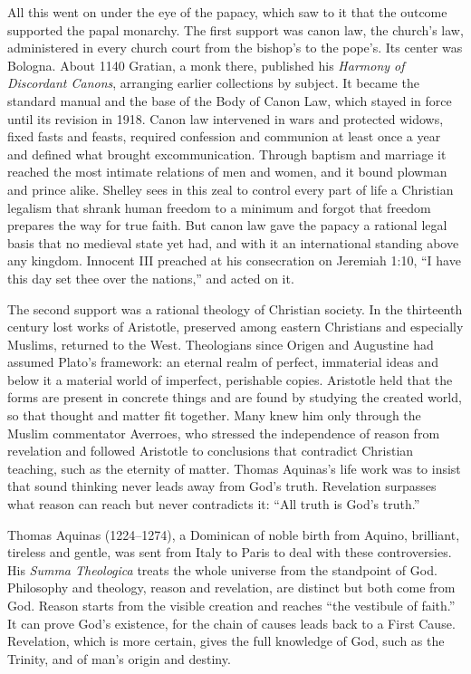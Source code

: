 All this went on under the eye of the papacy, which saw to it that the outcome supported the papal
monarchy. The first support was canon law, the church's law, administered in every church court from
the bishop's to the pope's. Its center was Bologna. About 1140 Gratian, a monk there, published his
\emph{Harmony of Discordant Canons}, arranging earlier collections by subject. It became the
standard manual and the base of the Body of Canon Law, which stayed in force until its revision in
1918. Canon law intervened in wars and protected widows, fixed fasts and feasts, required confession
and communion at least once a year and defined what brought excommunication. Through baptism and
marriage it reached the most intimate relations of men and women, and it bound plowman and prince
alike. Shelley sees in this zeal to control every part of life a Christian legalism that shrank human
freedom to a minimum and forgot that freedom prepares the way for true faith. But canon law gave the
papacy a rational legal basis that no medieval state yet had, and with it an international standing
above any kingdom. Innocent III preached at his consecration on Jeremiah 1:10, ``I have this day set
thee over the nations,'' and acted on it.

The second support was a rational theology of Christian society. In the thirteenth century lost
works of Aristotle, preserved among eastern Christians and especially Muslims, returned to the West.
Theologians since Origen and Augustine had assumed Plato's framework: an eternal realm of perfect,
immaterial ideas and below it a material world of imperfect, perishable copies. Aristotle held that
the forms are present in concrete things and are found by studying the created world, so that thought
and matter fit together. Many knew him only through the Muslim commentator Averroes, who stressed the
independence of reason from revelation and followed Aristotle to conclusions that contradict
Christian teaching, such as the eternity of matter. Thomas Aquinas's life work was to insist that
sound thinking never leads away from God's truth. Revelation surpasses what reason can reach but
never contradicts it: ``All truth is God's truth.''

Thomas Aquinas (1224--1274), a Dominican of noble birth from Aquino, brilliant, tireless and gentle,
was sent from Italy to Paris to deal with these controversies. His \emph{Summa Theologica} treats the
whole universe from the standpoint of God. Philosophy and theology, reason and revelation, are
distinct but both come from God. Reason starts from the visible creation and reaches ``the vestibule
of faith.'' It can prove God's existence, for the chain of causes leads back to a First Cause.
Revelation, which is more certain, gives the full knowledge of God, such as the Trinity, and of man's
origin and destiny.

